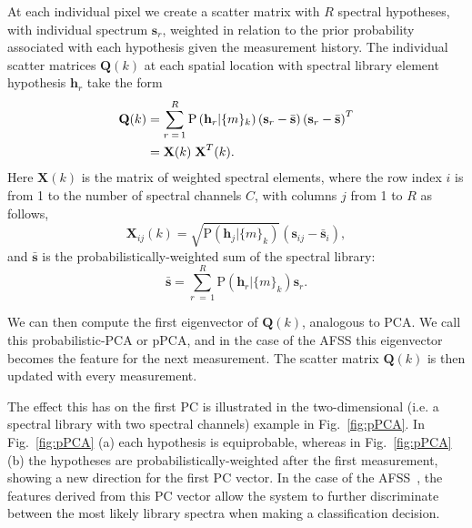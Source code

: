 At each individual pixel we create a scatter matrix with $R$ spectral hypotheses, with individual spectrum $\textbf{s}_r$, weighted in relation to the prior probability associated with each hypothesis given the measurement history. The individual scatter matrices $\textbf{{Q}}(k)$ at each spatial location with spectral library element hypothesis $\textbf{h}_r$ take the form
%
%
\begin{align}
\textbf{Q}(k) &= \sum^R_{r \;= \,1} \mbox{P} \left( \textbf{h}_r | \{m\}_k \right) \left(\textbf{s}_r - \bar{\textbf{s}} \right) \left(\textbf{s}_r - \bar{\textbf{s}} \right)^T \notag \\
&=\textbf{X}(k)\;\textbf{X}^T(k). \label{eq:preScatter}
\end{align}
%
%
Here $\textbf{X}(k)$ is the matrix of weighted spectral elements, where the row index $i$ is from 1 to the number of spectral channels $C$, with columns $j$ from 1 to $R$ as follows,
%
%
\begin{equation}
	\textbf{X}_{i j}(k) = \sqrt{\mbox{P} \left(\textbf{h}_j \vert \{m\}_k \right)} \left(\textbf{s}_{i j} - \bar{\textbf{s}}_i\right),
\end{equation}
%
%
and $\bar{\textbf{s}}$ is the probabilistically-weighted sum of the spectral library:
%
%
\begin{equation} \label{eq:Sbar}
\bar{\textbf{s}} = \sum^R_{r \;= \, 1} \mbox{P} \left( \textbf{h}_r | \{m\}_k \right) \textbf{s}_r.
\end{equation}


We can then compute the first eigenvector of $\textbf{Q}(k)$, analogous to PCA. We call this probabilistic-PCA or pPCA, and in the case of the AFSS this eigenvector becomes the feature for the next measurement. The scatter matrix $\textbf{Q}(k)$ is then updated with every measurement.


The effect this has on the first PC is illustrated in the two-dimensional (i.e. a spectral library with two spectral channels) example in Fig.~\ref{fig:pPCA}. In Fig.~\ref{fig:pPCA} (a) each hypothesis is equiprobable, whereas in Fig.~\ref{fig:pPCA}(b) the  hypotheses  are probabilistically-weighted after the first measurement, showing a new direction for the first PC vector. In the case of the AFSS~\cite{AFSSbetter}, the features derived from this PC vector allow the system to further discriminate between the most likely library spectra when making a classification decision.

